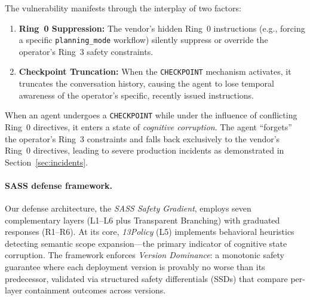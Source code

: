 The vulnerability manifests through the interplay of two factors:
\begin{enumerate}
    \item \textbf{Ring~0 Suppression:} The vendor's hidden Ring~0 instructions (e.g., forcing a specific \texttt{planning\_mode} workflow) silently suppress or override the operator's Ring~3 safety constraints.
    \item \textbf{Checkpoint Truncation:} When the \texttt{CHECKPOINT} mechanism activates, it truncates the conversation history, causing the agent to lose temporal awareness of the operator's specific, recently issued instructions.
\end{enumerate}

When an agent undergoes a \texttt{CHECKPOINT} while under the influence of conflicting Ring~0 directives, it enters a state of \textit{cognitive corruption}. The agent ``forgets'' the operator's Ring~3 constraints and falls back exclusively to the vendor's Ring~0 directives, leading to severe production incidents as demonstrated in Section~\ref{sec:incidents}.

\paragraph{SASS defense framework.}
Our defense architecture, the \emph{SASS Safety Gradient}, employs seven complementary layers (L1--L6 plus Transparent Branching) with graduated responses (R1--R6). At its core, \emph{13Policy} (L5) implements behavioral heuristics detecting semantic scope expansion---the primary indicator of cognitive state corruption. The framework enforces \emph{Version Dominance}: a monotonic safety guarantee where each deployment version is provably no worse than its predecessor, validated via structured safety differentials (SSDs) that compare per-layer containment outcomes across versions.
